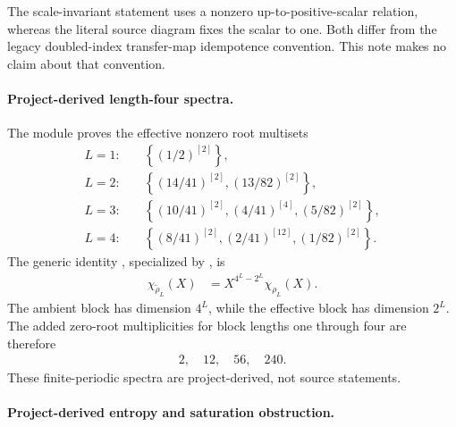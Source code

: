 \documentclass{article}
\begin{document}
The scale-invariant statement uses a nonzero up-to-positive-scalar relation,
whereas the literal source diagram fixes the scalar to one. Both differ from
the legacy doubled-index transfer-map idempotence convention. This note makes
no claim about that convention.

\paragraph{Project-derived length-four spectra.}

The module  proves the
effective nonzero root multisets
\begin{align}
    L=1:\quad
    &\left\{(1/2)^{[2]}\right\},
    \label{eq:cpsv16_examples_4_10_4_11_entropy_example411_effective_roots_one}\\
    L=2:\quad
    &\left\{(14/41)^{[2]},(13/82)^{[2]}\right\},
    \label{eq:cpsv16_examples_4_10_4_11_entropy_example411_effective_roots_two}\\
    L=3:\quad
    &\left\{(10/41)^{[2]},(4/41)^{[4]},(5/82)^{[2]}\right\},
    \label{eq:cpsv16_examples_4_10_4_11_entropy_example411_effective_roots_three}\\
    L=4:\quad
    &\left\{(8/41)^{[2]},(2/41)^{[12]},(1/82)^{[2]}\right\}.
    \label{eq:cpsv16_examples_4_10_4_11_entropy_example411_effective_roots_four}
\end{align}
The generic identity
, specialized
by
,
is
\begin{align}
    \chi_{\widetilde\rho_L}(X)
        &= X^{4^L-2^L}\chi_{\rho_L}(X).
    \label{eq:cpsv16_examples_4_10_4_11_entropy_example411_charpoly_embedding}
\end{align}
The ambient block has dimension $4^L$, while the effective block has dimension
$2^L$. The added zero-root multiplicities for block lengths one through four
are therefore
\begin{align}
    2,\quad 12,\quad 56,\quad 240.
    \label{eq:cpsv16_examples_4_10_4_11_entropy_example411_zero_multiplicities}
\end{align}
These finite-periodic spectra are project-derived, not source statements.

\paragraph{Project-derived entropy and saturation obstruction.}
\end{document}
